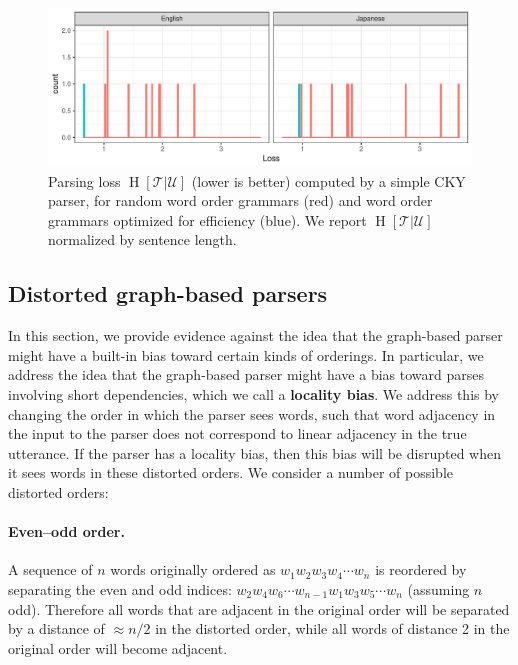 \documentclass[10pt,twoside,lineno]{article}
\newcommand{\key}[1]{\textbf{#1}}
\newcommand{\utterance}{\mathcal{U}}
\newcommand{\tree}{\mathcal{T}}
\begin{document}
\begin{figure}
    \centering
    \includegraphics[scale=.7]{../results/cky/cky-parse.pdf} 
	\caption{Parsing loss $\operatorname{H}[\tree|\utterance]$ (lower is better) computed by a simple CKY parser, for random word order grammars (red) and word order grammars optimized for efficiency (blue). We report $\operatorname{H}[\tree|\utterance]$ normalized by sentence length.}
    \label{fig:cky-parser}
\end{figure}



\subsection{Distorted graph-based parsers}
\label{sec:distorted}

In this section, we provide evidence against the idea that the graph-based parser might have a built-in bias toward certain kinds of orderings.%
In particular, we address the idea that the graph-based parser might have a bias toward parses involving short dependencies, which we call a \key{locality bias}. 
We address this by changing the order in which the parser sees words, such that word adjacency in the input to the parser does not correspond to linear adjacency in the true utterance.
If the parser has a locality bias, then this bias will be disrupted when it sees words in these distorted orders.
We consider a number of possible distorted orders:

\paragraph{Even--odd order.} A sequence of $n$ words originally ordered as $w_1 w_2 w_3 w_4 \cdots w_n$ is reordered by separating the even and odd indices: $w_2 w_4 w_6 \cdots w_{n-1} w_1 w_3 w_5 \cdots w_n$ (assuming $n$ odd). Therefore all words that are adjacent in the original order will be separated by a distance of $\approx n/2$ in the distorted order, while all words of distance 2 in the original order will become adjacent.
\end{document}
